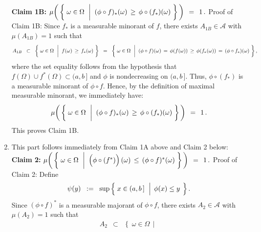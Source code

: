 \begin{enumerate}
	\vskip 0.5cm
	\noindent
	\textbf{Claim 1B:}\quad
	$\mu\!\left(\,\left\{\;
		\omega \in \Omega
		\,\;\left\vert\;\;
		(\phi \circ f)_{*}(\omega) \,\overset{{\color{white}\vert}}{\geq}\, \phi \circ (f_{*})(\omega)
		\right.
	\,\right\}\,\right)
	\,\;=\;\, 1\,.$
	\vskip 0.2cm
	\noindent
	Proof of Claim 1B:\;\;
	Since $f_{*}$ is a measurable minorant of $f$,
	there exists $A_{1B} \in \mathcal{A}$ with $\mu(A_{1B}) = 1$ such that
	\begin{equation*}
	A_{1B}
	\;\;\subset\;\;
		\left\{\;
			\omega \in \Omega
			\,\;\left\vert\;\;
			f(\omega) \,\overset{{\color{white}\vert}}{\geq}\, f_{*}(\omega)
		\right.
		\,\right\}
	\;\; = \;\;
		\left\{\;
			\omega \in \Omega
			\,\;\left\vert\;\;
			(\phi \circ f)(\omega) \,=\, \phi(f(\omega)) \,\overset{{\color{white}\vert}}{\geq}\, \phi(f_{*}(\omega)) \,=\, (\phi \circ f_{*})(\omega)
		\right.
		\,\right\},
	\end{equation*}
	where the set equality follows from the hypothesis that $f(\Omega) \cup f^{*}(\Omega) \subset (a,b\,]$
	and $\phi$ is nondecreasing on $(a,b\,]$.
	Thus, $\phi \circ (f_{*})$ is a measurable minorant of $\phi \circ f$.
	Hence, by the definition of maximal measurable minorant, we immediately have:
	\begin{equation*}
	\mu\!\left(\,\left\{\;
		\omega \in \Omega
		\,\;\left\vert\;\;
		(\phi \circ f)_{*}(\omega) \,\overset{{\color{white}\vert}}{\geq}\, \phi \circ (f_{*})(\omega)
		\right.
	\,\right\}\,\right)
	\,\;=\;\, 1\,.
	\end{equation*}
	This proves Claim 1B.
\item
	This part follows immediately from Claim 1A above and Claim 2 below:
	\vskip 0.3cm
	\noindent
	\textbf{Claim 2:}\quad
	$\mu\!\left(\,\left\{\;
		\omega \in \Omega
		\,\;\left\vert\;\;
		\left(\overset{{\color{white}.}}{\phi} \circ (f^{*})\right)(\omega)
			\,\overset{{\color{white}\vert}}{\leq}\,
			(\phi \circ f)^{*}(\omega)
		\right.
	\,\right\}\,\right)
	\,\;=\;\, 1\,.$
	\vskip 0.2cm
	\noindent
	Proof of Claim 2:\;\;
	Define
	\begin{equation*}
	\psi(y)
	\;\; := \;\;
		\sup\left\{\;
			x \in (a,b\,]
		\,\;\left\vert\;\,
			\overset{{\color{white}.}}{\phi}(x) \leq y
		\right.
		\;\right\}.
	\end{equation*}
	Since $(\phi \circ f)^{*}$ is a measurable majorant of $\phi \circ f$,
	there exists $A_{2} \in \mathcal{A}$ with $\mu(A_{2}) = 1$ such that
	\begin{eqnarray*}
	A_{2}
	&\subset&
		\left\{\;
			\omega \in \Omega
			\,\;\left\vert\;\;

\end{eqnarray*}
\end{enumerate}
